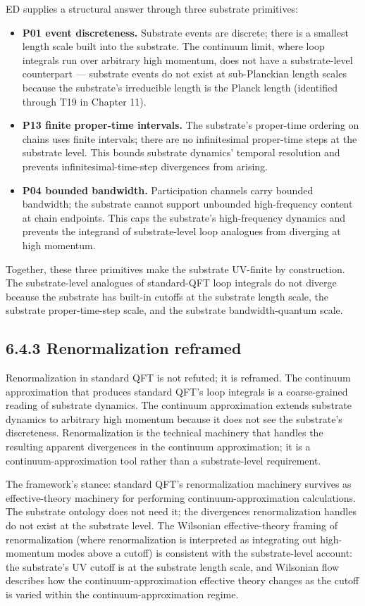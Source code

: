 \documentclass[11pt]{book}
\begin{document}
ED supplies a structural answer through three substrate primitives:

\begin{itemize}
\item \textbf{P01 event discreteness.} Substrate events are discrete; there is a smallest length scale built into the substrate. The continuum limit, where loop integrals run over arbitrary high momentum, does not have a substrate-level counterpart — substrate events do not exist at sub-Planckian length scales because the substrate's irreducible length is the Planck length (identified through T19 in Chapter 11).
\item \textbf{P13 finite proper-time intervals.} The substrate's proper-time ordering on chains uses finite intervals; there are no infinitesimal proper-time steps at the substrate level. This bounds substrate dynamics' temporal resolution and prevents infinitesimal-time-step divergences from arising.
\item \textbf{P04 bounded bandwidth.} Participation channels carry bounded bandwidth; the substrate cannot support unbounded high-frequency content at chain endpoints. This caps the substrate's high-frequency dynamics and prevents the integrand of substrate-level loop analogues from diverging at high momentum.
\end{itemize}

Together, these three primitives make the substrate UV-finite by construction. The substrate-level analogues of standard-QFT loop integrals do not diverge because the substrate has built-in cutoffs at the substrate length scale, the substrate proper-time-step scale, and the substrate bandwidth-quantum scale.

\subsection{6.4.3 Renormalization reframed}

Renormalization in standard QFT is not refuted; it is reframed. The continuum approximation that produces standard QFT's loop integrals is a coarse-grained reading of substrate dynamics. The continuum approximation extends substrate dynamics to arbitrary high momentum because it does not see the substrate's discreteness. Renormalization is the technical machinery that handles the resulting apparent divergences in the continuum approximation; it is a continuum-approximation tool rather than a substrate-level requirement.

The framework's stance: standard QFT's renormalization machinery survives as effective-theory machinery for performing continuum-approximation calculations. The substrate ontology does not need it; the divergences renormalization handles do not exist at the substrate level. The Wilsonian effective-theory framing of renormalization (where renormalization is interpreted as integrating out high-momentum modes above a cutoff) is consistent with the substrate-level account: the substrate's UV cutoff is at the substrate length scale, and Wilsonian flow describes how the continuum-approximation effective theory changes as the cutoff is varied within the continuum-approximation regime.
\end{document}
